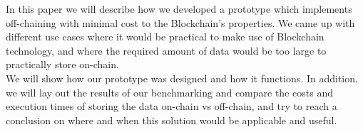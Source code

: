 In this paper we will describe how we developed a prototype which implements off-chaining with minimal cost to the Blockchain’s properties. We came up with different use cases where it would be practical to make use of Blockchain technology, and where the required amount of data would be too large to practically store on-chain.\\
We will show how our prototype was designed and how it functions. In addition, we will lay out the results of our benchmarking and compare the costs and execution times of storing the data on-chain vs off-chain, and try to reach a conclusion on where and when this solution would be applicable and useful. 


\newpage
